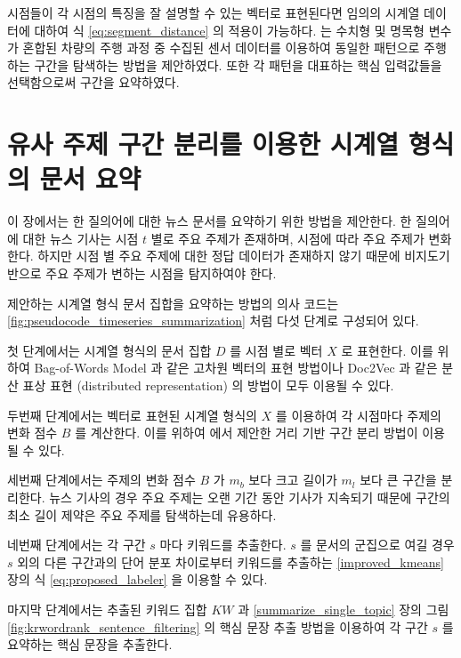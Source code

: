 \documentclass[oneside, ko,phd]{snuthesis_utf8_kor}
\begin{document}
시점들이 각 시점의 특징을 잘 설명할 수 있는 벡터로 표현된다면 임의의 시계열 데이터에 대하여 식 \ref{eq:segment_distance} 의 적용이 가능하다.
\cite{kim2019representation} 는 수치형 및 명목형 변수가 혼합된 차량의 주행 과정 중 수집된 센서 데이터를 이용하여 동일한 패턴으로 주행하는 구간을 탐색하는 방법을 제안하였다.
또한 각 패턴을 대표하는 핵심 입력값들을 선택함으로써 구간을 요약하였다.

\section{유사 주제 구간 분리를 이용한 시계열 형식의 문서 요약}

이 장에서는 한 질의어에 대한 뉴스 문서를 요약하기 위한 방법을 제안한다.
한 질의어에 대한 뉴스 기사는 시점 $t$ 별로 주요 주제가 존재하며, 시점에 따라 주요 주제가 변화한다.
하지만 시점 별 주요 주제에 대한 정답 데이터가 존재하지 않기 때문에 비지도기반으로 주요 주제가 변하는 시점을 탐지하여야 한다.

제안하는 시계열 형식 문서 집합을 요약하는 방법의 의사 코드는 \ref{fig:pseudocode_timeseries_summarization} 처럼 다섯 단계로 구성되어 있다.

첫 단계에서는 시계열 형식의 문서 집합 $D$ 를 시점 별로 벡터 $X$ 로 표현한다.
이를 위하여 Bag-of-Words Model 과 같은 고차원 벡터의 표현 방법이나 Doc2Vec 과 같은 분산 표상 표현 (distributed representation) 의 방법이 모두 이용될 수 있다.

두번째 단계에서는 벡터로 표현된 시계열 형식의 $X$ 를 이용하여 각 시점마다 주제의 변화 점수 $B$ 를 계산한다.
이를 위하여 \cite{kim2019representation} 에서 제안한 거리 기반 구간 분리 방법이 이용될 수 있다.

세번째 단계에서는 주제의 변화 점수 $B$ 가 $m_b$ 보다 크고 길이가 $m_l$ 보다 큰 구간을 분리한다.
뉴스 기사의 경우 주요 주제는 오랜 기간 동안 기사가 지속되기 때문에 구간의 최소 길이 제약은 주요 주제를 탐색하는데 유용하다.

네번째 단계에서는 각 구간 $s$ 마다 키워드를 추출한다.
$s$ 를 문서의 군집으로 여길 경우 $s$ 외의 다른 구간과의 단어 분포 차이로부터 키워드를 추출하는  \ref{improved_kmeans} 장의 식 \ref{eq:proposed_labeler} 을 이용할 수 있다.

마지막 단계에서는 추출된 키워드 집합 $KW$ 과 \ref{summarize_single_topic} 장의 그림 \ref{fig:krwordrank_sentence_filtering} 의 핵심 문장 추출 방법을 이용하여 각 구간 $s$ 를 요약하는 핵심 문장을 추출한다.
\end{document}
